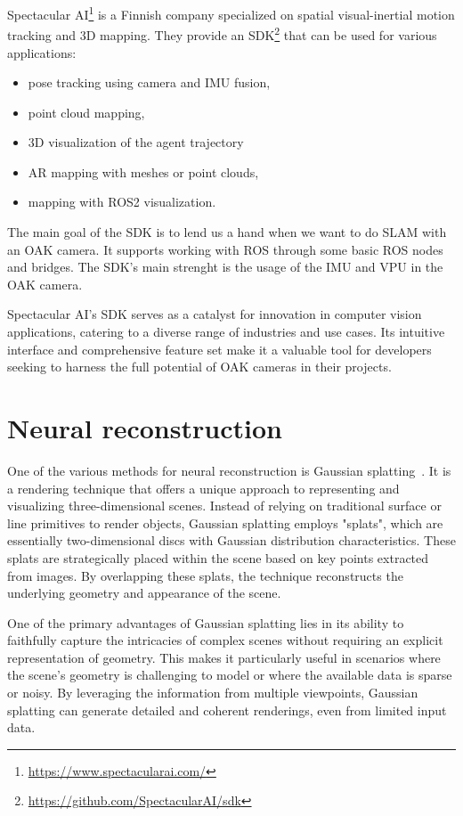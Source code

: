 Spectacular AI\footnote{\url{https://www.spectacularai.com/}} is a Finnish company specialized on spatial visual-inertial motion tracking and 3D mapping. They provide an SDK\footnote{\url{https://github.com/SpectacularAI/sdk}} that can be used for various applications:
\FloatBarrier
\begin{itemize}
\setlength\itemsep{0em}
    \item pose tracking using camera and IMU fusion,
    \item point cloud mapping,
    \item 3D visualization of the agent trajectory
    \item AR mapping with meshes or point clouds,
    \item mapping with ROS2 visualization.
\end{itemize}
\FloatBarrier
The main goal of the SDK is to lend us a hand when we want to do SLAM with an OAK camera. It supports working with ROS through some basic ROS nodes and bridges. The SDK's main strenght is the usage of the IMU and VPU in the OAK camera.

Spectacular AI's SDK serves as a catalyst for innovation in computer vision applications, catering to a diverse range of industries and use cases. Its intuitive interface and comprehensive feature set make it a valuable tool for developers seeking to harness the full potential of OAK cameras in their projects.

\section{Neural reconstruction}

One of the various methods for neural reconstruction is Gaussian splatting~\cite{3DGS}. It is a rendering technique that offers a unique approach to representing and visualizing three-dimensional scenes. Instead of relying on traditional surface or line primitives to render objects, Gaussian splatting employs "splats", which are essentially two-dimensional discs with Gaussian distribution characteristics. These splats are strategically placed within the scene based on key points extracted from images. By overlapping these splats, the technique reconstructs the underlying geometry and appearance of the scene.

One of the primary advantages of Gaussian splatting lies in its ability to faithfully capture the intricacies of complex scenes without requiring an explicit representation of geometry. This makes it particularly useful in scenarios where the scene's geometry is challenging to model or where the available data is sparse or noisy. By leveraging the information from multiple viewpoints, Gaussian splatting can generate detailed and coherent renderings, even from limited input data.

